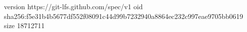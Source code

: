 version https://git-lfs.github.com/spec/v1
oid sha256:f5e31b4b5677df552f08091c44d99b7232940a8864ec232c997eae9705bb0619
size 18712711
